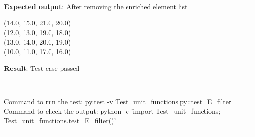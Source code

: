 \documentclass[fleqn, 12.5pt,a4paper]{report}
\begin{document}
\\
\textbf{Expected output}: After removing the enriched element list
\begin{center}
(14.0, 15.0, 21.0, 20.0)\\
(12.0, 13.0, 19.0, 18.0)\\
(13.0, 14.0, 20.0, 19.0)\\
(10.0, 11.0, 17.0, 16.0)
\end{center}
\textbf{Result}: Test case passed
\\
{\rule{\linewidth}{0.02cm}}\\
Command to run the test: {\selectfont py.test -v  Test{\_}unit{\_}functions.py::test{\_}E{\_}filter}\\
Command to check the output: {\selectfont python -c ’import Test{\_}unit{\_}functions;\\
Test{\_}unit{\_}functions.test{\_}E{\_}filter()’}\\
{\rule{\linewidth}{0.02cm}}
\end{document}
